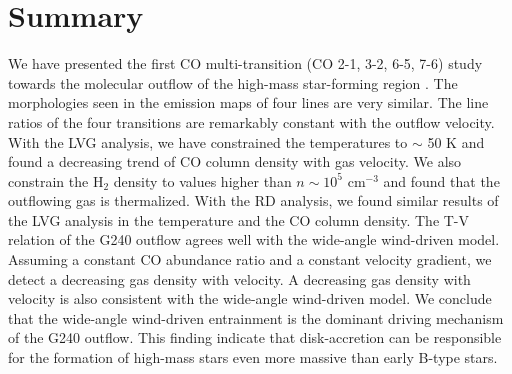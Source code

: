 \section{Summary}\label{summary}

We have presented the first CO multi-transition (CO 2-1, 3-2, 6-5, 7-6) study towards the molecular outflow of the high-mass star-forming region . The morphologies seen in the emission maps of four lines are very similar.  The line ratios of the four transitions are remarkably constant with the outflow velocity.  With the LVG analysis, we have constrained the temperatures to $\sim$ 50 K and found a decreasing trend of CO column density with gas velocity. We also constrain the H$_2$ density to values higher than $n \sim 10^5$ cm$^{-3}$ and found that the outflowing gas is thermalized. With the RD analysis, we found similar results of the LVG analysis in the temperature and the CO column density. The T-V relation of the G240 outflow agrees well with the wide-angle wind-driven model. Assuming a constant CO abundance ratio and a constant velocity gradient, we detect a decreasing gas density with velocity. A decreasing gas density with velocity is also consistent with the wide-angle wind-driven model. We conclude that the wide-angle wind-driven entrainment is the dominant driving mechanism of the G240 outflow. This finding indicate that disk-accretion can be responsible for the formation of high-mass stars even more massive than early B-type stars.

